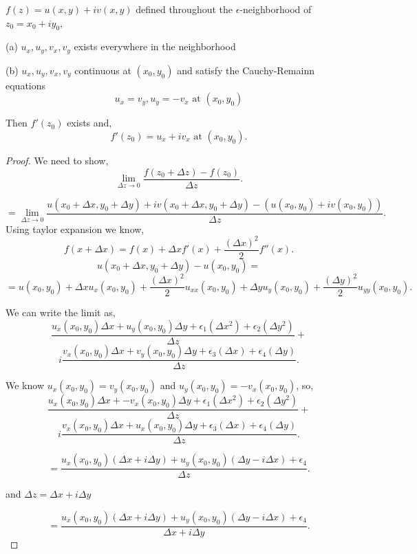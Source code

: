\begin{theorem}
   $f(z) = u(x,y) + iv(x,y)$ defined throughout the $\epsilon$-neighborhood of $z_0 = x_0 + iy_0$, 

   (a) $u_x,u_y,v_x,v_y$ exists everywhere in the neighborhood

   (b)  $u_x, u_y, v_x, v_y$ continuous at  $(x_0,y_0)$ and satisfy the Cauchy-Remainn equations $$u_x = v_y, u_y = -v_x \text{ at }  (x_0,y_0)$$

   Then $f'(z_0)$  exists and, \[
      f'(z_0) = u_x + iv_x \text{ at } (x_0,y_0)
   .\]
\end{theorem}
\begin{proof}
   We need to show,
   \[
   \lim_{\Delta z \to 0} \frac{f(z_0 + \Delta z) - f(z_0)}{\Delta z}
   .\] 

   \[
   = \lim_{\Delta z \to 0} \frac{u(x_0+ \Delta x, y_0 + \Delta y) + iv(x_0+ \Delta x, y_0 + \Delta y) - (u(x_0,y_0) + iv(x_0,y_0))}{\Delta z}
.\]
Using taylor expansion we know, \[
f(x + \Delta x) = f(x) + \Delta xf'(x) + \frac{(\Delta x)^2}{2}f''(x)
.\] 
\[
   u(x_0+\Delta x, y_0 + \Delta y) - u(x_0,y_0)  = 
\]   
\[
   = u(x_0,y_0) + \Delta x u_x(x_0,y_0) + \frac{(\Delta x)^2}{2} u_{xx}(x_0,y_0) + \Delta y u_y(x_0, y_0) + \frac{(\Delta y)^2}{2}u_{yy} (x_0, y_0) 
.\] 


We can write the limit as, \[
   \frac{u_x(x_0,y_0)\Delta x + u_y (x_0,y_0)\Delta y +  \epsilon_1(\Delta x^2) + \epsilon_2(\Delta y^2)}{\Delta z} + 
\] 
\[
   i\frac{v_x(x_0,y_0)\Delta x + v_y(x_0,y_0)\Delta y + \epsilon_3(\Delta x) + \epsilon_4(\Delta y)}{\Delta z}
.\] 


We know $u_x(x_0,y_0) = v_y(x_0,y_0)$ and $u_y(x_0,y_0) = - v_x(x_0,y_0)$, so,
\[
   \frac{u_x(x_0,y_0)\Delta x + -v_x (x_0,y_0)\Delta y +  \epsilon_1(\Delta x^2) + \epsilon_2(\Delta y^2)}{\Delta z} + 
\] 
\[
   i\frac{v_x(x_0,y_0)\Delta x + u_x(x_0,y_0)\Delta y + \epsilon_3(\Delta x) + \epsilon_4(\Delta y)}{\Delta z}
.\] 

\[
= \frac{u_x(x_0,y_0)(\Delta x + i \Delta y) + u_y(x_0,y_0)(\Delta y - i\Delta x) + \epsilon_4}{\Delta z}
.\] 


and $\Delta z = \Delta x + i \Delta y$

\[
= \frac{u_x(x_0,y_0)(\Delta x + i \Delta y) + u_y(x_0,y_0)(\Delta y - i\Delta x) + \epsilon_4}{\Delta x + i \Delta y}
.\] 


\end{proof}

